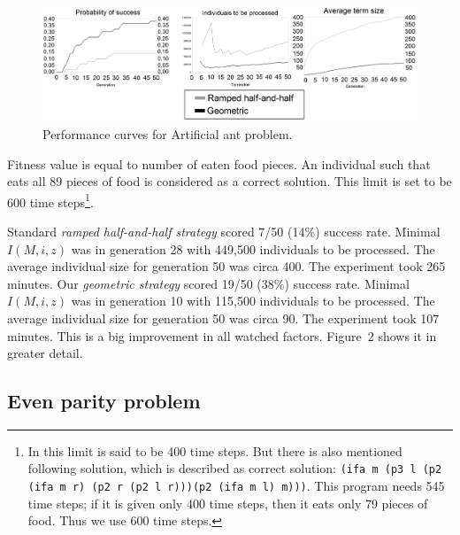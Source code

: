 \documentclass{llncs}
\begin{document}
\begin{figure}[h!]
  \caption{Performance curves for Artificial ant problem.}
  \centering
    \includegraphics[scale=0.135]{imgs/ANT_FINAL.png}
\end{figure}

Fitness value is equal to number of eaten food pieces.
An individual such that eats all 89 pieces of food is 
considered as a correct solution.
This limit is set to be 600 time steps\footnote{
In \cite{koza92} this limit is said to be 400 time steps.
But there is also mentioned following solution, 
which is described as correct solution:
\texttt{(ifa m (p3 l (p2 (ifa m r) (p2 r (p2 l r)))(p2 (ifa m l) m)))}.
This program needs 545
time steps; if it is given only 400 time steps, then it eats only 79 pieces
of food. Thus we use 600 time steps. 
}.

Standard \textit{ramped half-and-half strategy} scored 7/50 (14\%) success rate. 
Minimal $I(M,i,z)$ was in generation 28 with 449,500 individuals to be processed.
The average individual size for generation 50 was circa 400.
The experiment took 265 minutes.
Our \textit{geometric strategy} scored 19/50 (38\%) success rate. 
Minimal $I(M,i,z)$ was in generation 10 with 115,500 individuals to be processed.
The average individual size for generation 50 was circa 90.
The experiment took 107 minutes.
This is a big improvement in all watched factors.
Figure~2 shows it in greater detail.

\subsection{Even parity problem}
\end{document}
